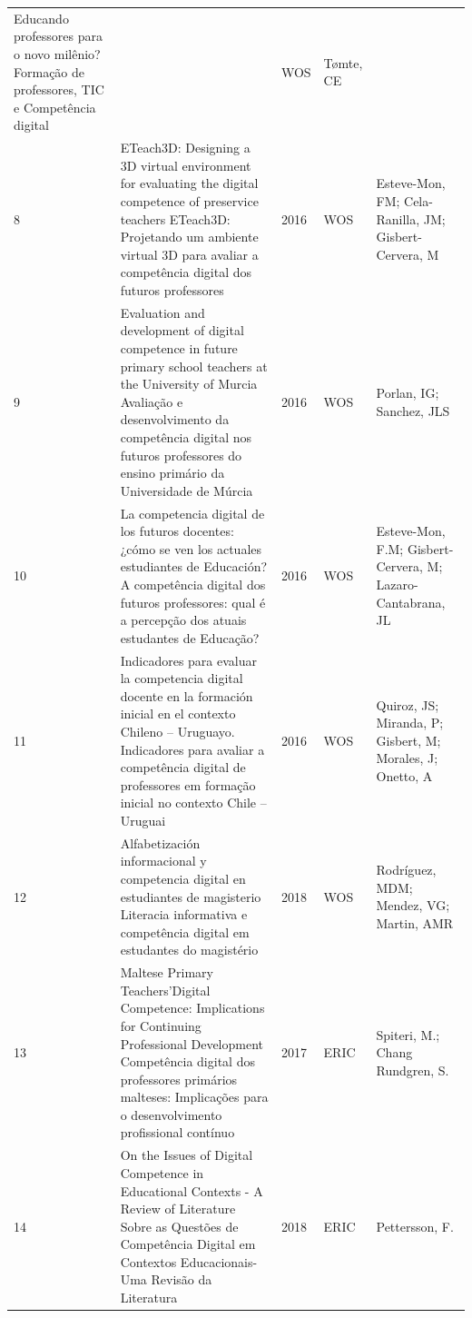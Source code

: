 \documentclass[portuguese]{textolivre}
\begin{document}
\begin{small}
\begin{longtable}{
    @{}l >{\raggedright\arraybackslash}p{}
    @{}ll
    >{\raggedright\arraybackslash}p{}@{}
    }
Educando professores para o novo milênio? Formação de professores, TIC e Competência digital & 2015 & WOS & Tømte, CE \\
8 & ETeach3D: Designing a 3D virtual environment for evaluating the digital competence of preservice teachers \newline
ETeach3D: Projetando um ambiente virtual 3D para avaliar a competência digital dos futuros professores & 2016 & WOS & Esteve-Mon, FM; Cela-Ranilla, JM; Gisbert-Cervera, M\\
9 & Evaluation and development of digital competence in future primary school teachers at the University of Murcia \newline
Avaliação e desenvolvimento da competência digital nos futuros professores do ensino primário da Universidade de Múrcia & 2016 & WOS & Porlan, IG; Sanchez, JLS\\
10 & La competencia digital de los futuros docentes: ¿cómo se ven los actuales estudiantes de Educación? \newline
A competência digital dos futuros professores: qual é a percepção dos atuais estudantes de Educação?	& 2016 & WOS & Esteve-Mon, F.M; Gisbert-Cervera, M; Lazaro-Cantabrana, JL \\
11 & Indicadores para evaluar la competencia digital docente en la formación inicial en el contexto Chileno – Uruguayo. \newline
Indicadores para avaliar a competência digital de professores em formação inicial no contexto Chile – Uruguai & 2016 & WOS & Quiroz, JS; Miranda, P; Gisbert, M; Morales, J; Onetto, A \\
12 & Alfabetización informacional y competencia digital en estudiantes de magisterio \newline
Literacia informativa e competência digital em estudantes do magistério & 2018 & WOS & Rodríguez, MDM; Mendez, VG; Martin, AMR \\
13 & Maltese Primary Teachers'Digital Competence: Implications for Continuing Professional Development \newline
Competência digital dos professores primários malteses: Implicações para o desenvolvimento profissional contínuo & 2017 & ERIC & Spiteri, M.; Chang Rundgren, S.\\
14 & On the Issues of Digital Competence in Educational Contexts - A Review of Literature \newline
Sobre as Questões de Competência Digital em Contextos Educacionais- Uma Revisão da Literatura & 2018 & ERIC & Pettersson, F. \\

\end{longtable}
\end{small}
\end{document}

